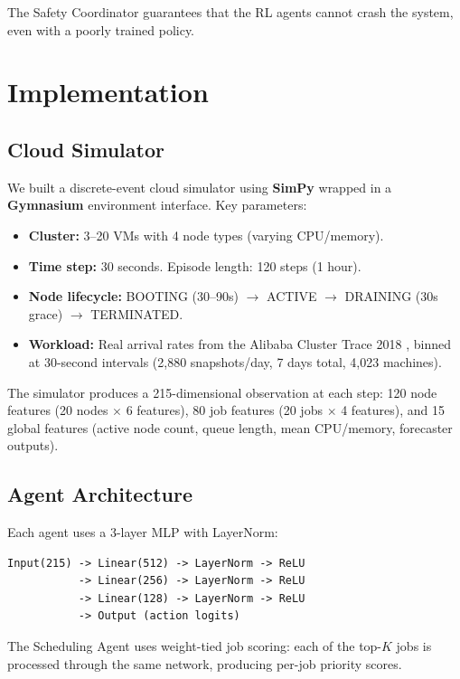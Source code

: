 \documentclass[12pt,a4paper]{article}
\begin{document}
The Safety Coordinator guarantees that the RL agents cannot crash the system,
even with a poorly trained policy.


\section{Implementation}


\subsection{Cloud Simulator}

We built a discrete-event cloud simulator using \textbf{SimPy} wrapped in a
\textbf{Gymnasium} environment interface. Key parameters:

\begin{itemize}
  \item \textbf{Cluster:} 3--20 VMs with 4 node types (varying CPU/memory).
  \item \textbf{Time step:} 30 seconds. Episode length: 120 steps (1 hour).
  \item \textbf{Node lifecycle:} BOOTING (30--90s) $\rightarrow$ ACTIVE
        $\rightarrow$ DRAINING (30s grace) $\rightarrow$ TERMINATED.
  \item \textbf{Workload:} Real arrival rates from the Alibaba Cluster Trace
        2018 \cite{alibaba2018}, binned at 30-second intervals (2,880
        snapshots/day, 7 days total, 4,023 machines).
\end{itemize}

The simulator produces a 215-dimensional observation at each step:
120 node features (20 nodes $\times$ 6 features), 80 job features
(20 jobs $\times$ 4 features), and 15 global features (active node count,
queue length, mean CPU/memory, forecaster outputs).

\subsection{Agent Architecture}

Each agent uses a 3-layer MLP with LayerNorm:

\begin{lstlisting}
Input(215) -> Linear(512) -> LayerNorm -> ReLU
           -> Linear(256) -> LayerNorm -> ReLU
           -> Linear(128) -> LayerNorm -> ReLU
           -> Output (action logits)
\end{lstlisting}

The Scheduling Agent uses weight-tied job scoring: each of the top-$K$ jobs is
processed through the same network, producing per-job priority scores.
\end{document}
